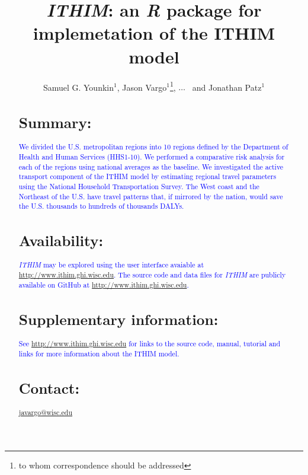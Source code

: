 \documentclass{bioinfo}
\newcommand{\col}[2][red]{\textcolor{#1}{#2}}
\newcommand{\package}{\emph{ITHIM}}
\newcommand{\R}{\emph{R}}
\newcommand{\webpage}{\url{http://www.ithim.ghi.wisc.edu}}
\begin{document}

\title[\package{}]{\package{}: an \R{} package for implemetation of
  the ITHIM model}
\author[Younkin \textit{et~al}]{Samuel G. Younkin$^{1}$,
  Jason Vargo$^{1}$\footnote{to whom correspondence should be addressed},
  $\ldots$
  \ and Jonathan Patz$^{1}$}
\address{$^{1}$Global Health Institute\\
University of Wisconsin{\textendash}Madison, Madison, WI USA\\
}


\maketitle

\begin{abstract}

\section{Summary:}
\col[blue]{We divided the U.S. metropolitan regions into 10 regions defined by
the Department of Health and Human Services (HHS1-10).  We performed a
comparative risk analysis for each of the regions using national
averages as the baseline.  We investigated the active transport
component of the ITHIM model by estimating regional travel parameters
using the National Household Transportation Survey.  The West coast
and the Northeast of the U.S. have travel patterns that, if mirrored
by the nation, would save the U.S. thousands to hundreds of thousands
DALYs.}

\section{Availability:}
\col[blue]{\package{} may be explored using the user interface avaiable
at \webpage{}.  The source code and data files for \package{} are
publicly available on GitHub at \webpage{}.}

\section{Supplementary information:}

\col[blue]{See \webpage{} for links to the source code, manual, tutorial and
links for more information about the ITHIM model.}

\section{Contact:}
\col[blue]{\href{javargo@wisc.edu}{javargo@wisc.edu}}
\end{abstract}
\end{document}
